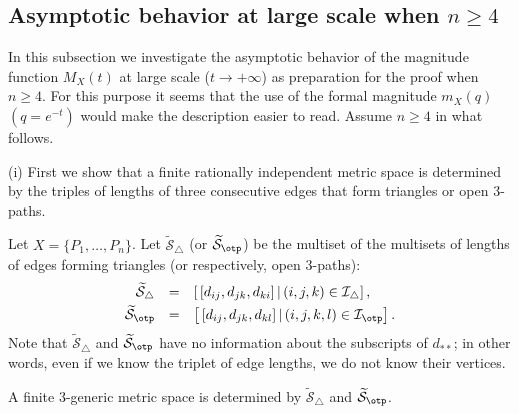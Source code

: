 \subsection{Asymptotic behavior at large scale when $n\ge4$}\label{large-scale_asympt} 
%
%
In this subsection we investigate the asymptotic behavior of the magnitude function $M_X(t)$ at large scale ($t\to+\infty$) as preparation for the proof when $n\ge4$. For this purpose it seems that the use of the formal magnitude $m_X(q)$ $(q=e^{-t})$ would make the description easier to read. 
Assume $n\ge4$ in what follows. 

(i) First we show that a finite rationally independent metric space is determined by the triples of lengths of three consecutive edges that form triangles or open $3$-paths. 


Let $X=\{P_1,\dots,P_n\}$. 
Let $\widetilde{\mathcal{S}}_\triangle$ (or $\widetilde{\mathcal{S}}_\otp$) be the multiset of the multisets of lengths of edges forming triangles (or respectively, open $3$-paths): 
\begin{equation}
\begin{array}{rcl}
\widetilde{\mathcal{S}}_\triangle&=&\displaystyle \left[\,[d_{ij},d_{jk},d_{ki}]\,|\,(i,j,k)\in \mathcal{I}_\triangle \right], \notag \\[1mm]
%
\widetilde{\mathcal{S}}_\otp&=&\displaystyle \left[\,[d_{ij},d_{jk},d_{kl}]\,|\,(i,j,k,l)\in \mathcal{I}_\otp \right].
\notag 
\end{array} 
\end{equation}
%
Note that $\widetilde{\mathcal{S}}_\triangle$ and $\widetilde{\mathcal{S}}_\otp$ have no information about the subscripts of $d_{\ast\ast}$; in other words, even if we know the triplet of edge lengths, we do not know their vertices.
%
\begin{lemma}\label{lemma_determine}
A finite $3$-generic metric space is determined by $\widetilde{\mathcal{S}}_\triangle$ and $\widetilde{\mathcal{S}}_\otp$. 
\end{lemma}

